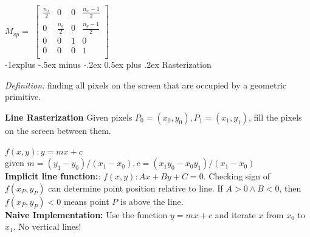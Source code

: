 \documentclass[letterpaper, 8pt]{extarticle}
\makeatletter
\renewcommand{\section}{\@startsection{section}{1}{0mm}%
                                {-1explus -.5ex minus -.2ex}%
                                {0.5ex plus .2ex}%
                                {\normalfont\normalsize\bfseries}}
\makeatother
\begin{document}
\begin{multicols*}{4}
$M_{vp} = $
\(
\begin{bmatrix}
    \frac{n_x}{2} & 0             & 0 & \frac{n_x-1}{2} \\
    0             & \frac{n_y}{2} & 0 & \frac{n_y-1}{2} \\
    0             & 0             & 1 & 0               \\
    0             & 0             & 0 & 1               \\
\end{bmatrix}
\)\\



\section{Rasterization}

\textit{Definition:} finding all pixels on the screen that are occupied by a geometric primitive.

\textbf{Line Rasterization}
Given pixels $P_0 = (x_0, y_0), P_1 = (x_1, y_1)$, fill the pixels on the screen between them.

$f(x, y): y = mx + c$\\given $m=(y_1 - y_0)/(x_1 - x_0), c=(x_1y_0 - x_0y_1)/(x_1 - x_0)$\\
\textbf{Implicit line function:}: $f(x,y): Ax + By + C = 0$. Checking sign of $f(x_P, y_P)$ can determine point position relative to line. If $A>0 \land B<0$, then $f(x_P, y_P) < 0$ means point $P$ is above the line.\\

\textbf{Naive Implementation:} Use the function $y=mx+c$ and iterate $x$ from $x_0$ to $x_1$. No vertical lines!\\




\end{multicols*}
\end{document}
